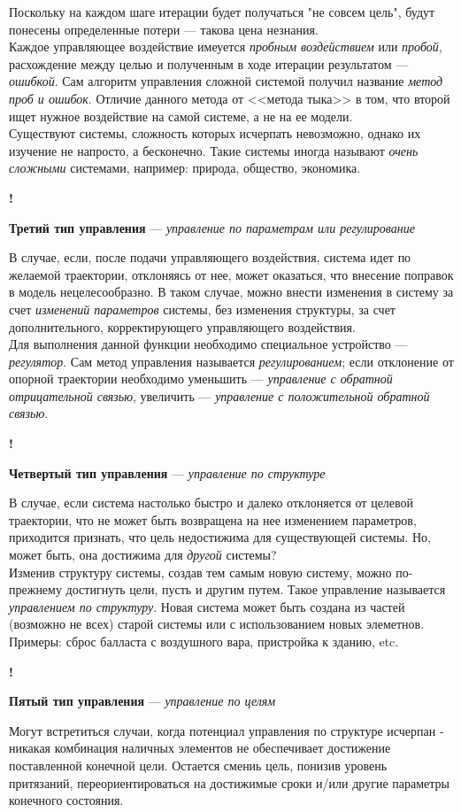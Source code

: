 \documentclass{article}
\newcommand{\note}[1]{\textit{#1}}
\newcommand{\define}[2]{
	\textbf{#1} --- #2
	}
\newcommand{\marked}[2]{
	\begin{flushright}\textbf{!}\hspace{2ex}\vline\hspace{2ex}
		\begin{minipage}{0.9\textwidth}
			\define{#1}{#2}
		\end{minipage}
	\end{flushright}
	}
\begin{document}
Поскольку на каждом шаге итерации будет получаться "не совсем цель", будут понесены определенные потери --- такова цена незнания.\\
Каждое управляющее воздействие имеуется \note{пробным воздействием} или \note{пробой}, расхождение между целью и полученным в ходе итерации результатом --- \note{ошибкой}. Сам алгоритм управления сложной системой получил название \note{метод проб и ошибок}. Отличие данного метода от <<метода тыка>> в том, что второй ищет нужное воздействие на самой системе, а не на ее модели.\\
Существуют системы, сложность которых исчерпать невозможно, однако их изучение не напросто, а бесконечно. Такие системы иногда называют \note{очень сложными} системами, например: природа, общество, экономика.
\marked{Третий тип управления}{\note{управление по параметрам или регулирование}}
В случае, если, после подачи управляющего воздействия, система идет по желаемой траектории, отклоняясь от нее, может оказаться, что внесение поправок в модель нецелесообразно. В таком случае, можно внести изменения в систему за счет \note{изменений параметров} системы, без изменения структуры, за счет дополнительного, корректирующего управляющего воздействия.\\
Для выполнения данной функции необходимо специальное устройство --- \note{регулятор}. Сам метод управления называется \note{регулированием}; если отклонение от опорной траектории необходимо уменьшить --- \note{управление с обратной отрицательной связью}, увеличить --- \note{управление с положительной обратной связью}.
\marked{Четвертый тип управления}{\note{управление по структуре}}
В случае, если система настолько быстро и далеко отклоняется от целевой траектории, что не может быть возвращена на нее изменением параметров, приходится признать, что цель недостижима для существующей системы. Но, может быть, она достижима для \note{другой} системы?\\
Изменив структуру системы, создав тем самым новую систему, можно по-прежнему достигнуть цели, пусть и другим путем. Такое управление называется \note{управлением по структуру}. Новая система может быть создана из частей (возможно не всех) старой системы или с использованием новых элеметнов. Примеры: сброс балласта с воздушного вара, пристройка к зданию, etc.
\marked{Пятый тип управления}{\note{управление по целям}}
Могут встретиться случаи, когда потенциал управления по структуре исчерпан - никакая комбинация наличных элементов не обеспечивает достижение поставленной конечной цели. Остается смениь цель, понизив уровень притязаний, переориентироваться на достижимые сроки и/или другие параметры конечного состояния.\\
\end{document}
